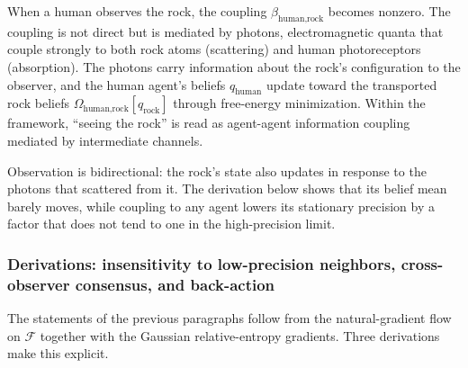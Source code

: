 When a human observes the rock, the coupling $\beta_{\text{human,rock}}$ becomes nonzero. The coupling is not direct but is mediated by photons, electromagnetic quanta that couple strongly to both rock atoms (scattering) and human photoreceptors (absorption). The photons carry information about the rock's configuration to the observer, and the human agent's beliefs $q_{\text{human}}$ update toward the transported rock beliefs $\Omega_{\text{human,rock}}[q_{\text{rock}}]$ through free-energy minimization. Within the framework, ``seeing the rock'' is read as agent-agent information coupling mediated by intermediate channels.

Observation is bidirectional: the rock's state also updates in response to the photons that scattered from it. The derivation below shows that its belief mean barely moves, while coupling to any agent lowers its stationary precision by a factor that does not tend to one in the high-precision limit.

\subsubsection{Derivations: insensitivity to low-precision neighbors, cross-observer consensus, and back-action}
\label{sec:rock_derivations}

The statements of the previous paragraphs follow from the natural-gradient flow on $\mathcal{F}$ together with the Gaussian relative-entropy gradients. Three derivations make this explicit.

